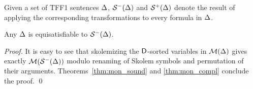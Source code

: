 Given a set of TFF1 sentences $\mathrm{\Delta}$,
$\mathcal{S}^-(\mathrm{\Delta})$ and $\mathcal{S}^+(\mathrm{\Delta})$ denote the result of applying
the corresponding transformations to every formula in $\mathrm{\Delta}$.

\begin{theorem} \label{thm:sko}
Any $\mathrm{\Delta}$ is equisatisfiable to $\mathcal{S}^-(\mathrm{\Delta})$.
\end{theorem}
\begin{proof}
It is easy to see that
skolemizing the $\mathsf{D}$-sorted variables in $\mathcal{M}(\mathrm{\Delta})$ gives
exactly $\mathcal{M}(\mathcal{S}^-(\mathrm{\Delta}))$ modulo renaming of Skolem symbols and
permutation of their arguments. Theorems~\ref{thm:mon_sound} and
\ref{thm:mon_compl} conclude the proof.
\qed
\end{proof}

%
